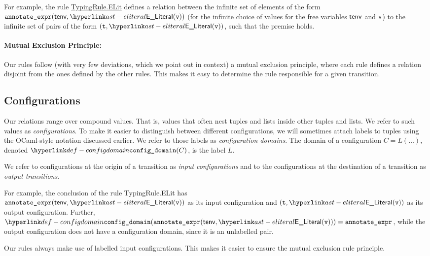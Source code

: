 For example, the rule \hyperlink{TypingRule.ELit}{TypingRule.ELit} defines a relation
between the infinite set of elements of the form
$\texttt{annotate\_expr}(\tenv, \ELiteral(\vv))$ (for the
infinite choice of values for the free variables $\textsf{tenv}$ and
$\texttt{v}$) to the infinite set of pairs of the form $(\vt,
\ELiteral(\vv))$, such that the premise holds.

\paragraph{Mutual Exclusion Principle:}
Our rules follow (with very few deviations, which we point out
in context) a mutual exclusion principle, where each rule
defines a relation disjoint from the ones defined by the other
rules.  This makes it easy to determine the rule responsible
for a given transition.

\hypertarget{def-configuration}{}
\subsection{Configurations}

\hypertarget{def-configdomain}{}
Our relations range over compound values. That is, values that often nest tuples and lists inside other tuples and lists.
We refer to such values as \emph{configurations}. To make it easier to distinguish between different configurations,
we will sometimes attach labels to tuples using the OCaml-style notation discussed earlier.
We refer to those labels as \emph{configuration domains}.
The domain of a configuration $C=L(\ldots)$, denoted $\configdomain{C}$, is the label $L$.

We refer to configurations at the origin of a transition as \emph{input configurations} and to the
configurations at the destination of a transition as \emph{output transitions}.

For example, the conclusion of the rule TypingRule.ELit has \\
$\texttt{annotate\_expr}(\tenv, \ELiteral(\vv))$ as its input configuration
and $(\vt, \ELiteral(\vv))$ as its output configuration.
Further, \\
$\configdomain{\texttt{annotate\_expr}(\tenv, \ELiteral(\vv))} = \texttt{annotate\_expr}$,
while the output configuration does not have a configuration domain, since it is an unlabelled pair.

Our rules always make use of labelled input configurations. This makes it easier to ensure
the mutual exclusion rule principle.

